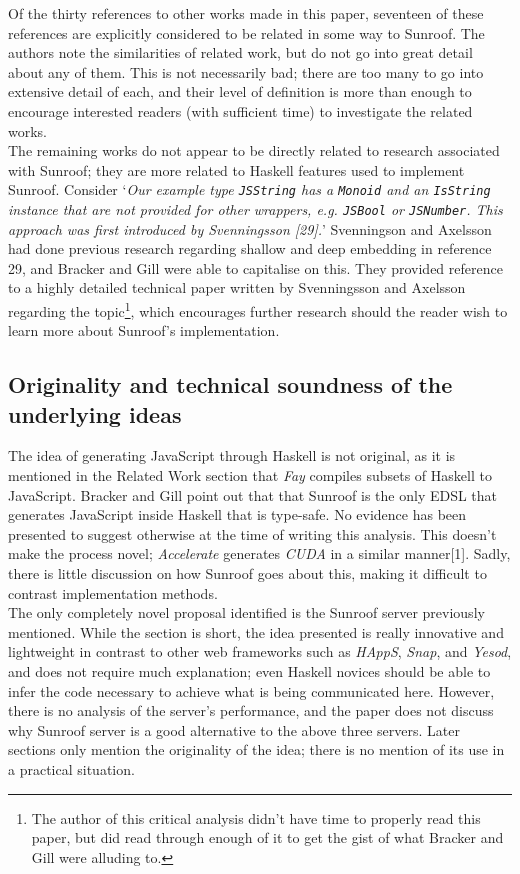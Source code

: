 \documentclass[9pt]{report}
\begin{document}
\noindent
Of the thirty references to other works made in this paper, seventeen of these references are explicitly considered to be related in some way to Sunroof.
The authors note the similarities of related work, but do not go into great detail about any of them.
This is not necessarily bad; there are too many to go into extensive detail of each, and their level of definition is more than enough to encourage interested readers (with sufficient time) to investigate the related works.\\

The remaining works do not appear to be directly related to research associated with Sunroof; they are more related to Haskell features used to implement Sunroof.
Consider `{\it Our example type \verb/JSString/ has a \verb/Monoid/ and an \verb/IsString/ instance that are not provided for other wrappers, e.g. \verb/JSBool/ or \verb/JSNumber/. This approach was first introduced by Svenningsson [29].}'
Svenningson and Axelsson had done previous research regarding shallow and deep embedding in reference 29, and Bracker and Gill were able to capitalise on this. They provided reference to a highly detailed technical paper written by Svenningsson and Axelsson regarding the topic\footnote{The author of this critical analysis didn't have time to properly read this paper, but did read through enough of it to get the gist of what Bracker and Gill were alluding to.}, which encourages further research should the reader wish to learn more about Sunroof's implementation.

\subsection*{Originality and technical soundness of the underlying ideas}
The idea of generating JavaScript through Haskell is not original, as it is mentioned in the Related Work section that {\it Fay} compiles subsets of Haskell to JavaScript.
Bracker and Gill point out that that Sunroof is the only EDSL that generates JavaScript inside Haskell that is type-safe.
No evidence has been presented to suggest otherwise at the time of writing this analysis.
This doesn't make the process novel; {\it Accelerate} generates {\it CUDA} in a similar manner[1].
Sadly, there is little discussion on how Sunroof goes about this, making it difficult to contrast implementation methods.\\

\noindent
The only completely novel proposal identified is the Sunroof server previously mentioned.
While the section is short, the idea presented is really innovative and lightweight in contrast to other web frameworks such as {\it HAppS}, {\it Snap}, and {\it Yesod}, and does not require much explanation; even Haskell novices should be able to infer the code necessary to achieve what is being communicated here.
However, there is no analysis of the server's performance, and the paper does not discuss why Sunroof server is a good alternative to the above three servers.
Later sections only mention the originality of the idea; there is no mention of its use in a practical situation.\\
\end{document}
